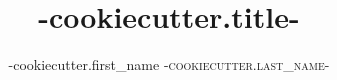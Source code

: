 \documentclass{notes}
\title{ {{-cookiecutter.title-}} }
\author{ {{-cookiecutter.first_name}} \textsc{ {{-cookiecutter.last_name-}} }}
\begin{document}
\maketitle

% 
\clearpage
\renewcommand{\thepage}{\roman{page}}
\setcounter{page}{1}

\dominitoc
\tableofcontents
\listoffigures
\listofmyequations

\clearpage
\renewcommand{\thepage}{\arabic{page}}
\setcounter{page}{1}



\end{document}
